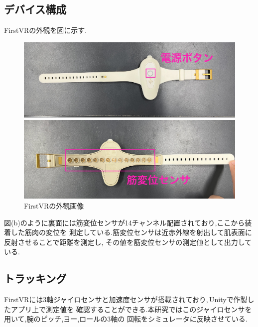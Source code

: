 \documentclass{ltjsreport}
\begin{document}
		\subsection{デバイス構成}
				FirstVRの外観を図に示す.
				\begin{figure}[H]
				\centering
				\begin{minipage}{0.75\columnwidth}
				\centering
				\includegraphics[width = \columnwidth]{../figs/IMG_0337.JPG}
				\end{minipage}
				\hspace{0.04\columnwidth}
				\begin{minipage}{0.75\columnwidth}
				\centering
				\includegraphics[width = \columnwidth]{../figs/IMG_0336.JPG}
				\end{minipage}
				\caption{FirstVRの外観画像}
				\label{fig:FirstVR}
				\end{figure}
\vspace{-15pt}

			図(b)のように裏面には筋変位センサが14チャンネル配置されており,ここから装着した筋肉の変位を
			測定している.筋変位センサは近赤外線を射出して肌表面に反射させることで距離を測定し,
			その値を筋変位センサの測定値として出力している.

		\subsection{トラッキング}
			FirstVRには3軸ジャイロセンサと加速度センサが搭載されており,\,Unityで作製したアプリ上で測定値を
			確認することができる.本研究ではこのジャイロセンサを用いて,腕のピッチ,ヨー,ロールの3軸の
			回転をシミュレータに反映させている.
\end{document}
